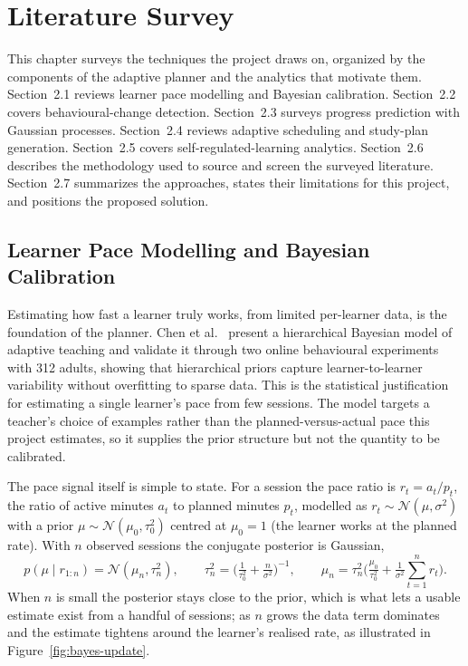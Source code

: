 \chapter{Literature Survey}
This chapter surveys the techniques the project draws on, organized by the components of the adaptive planner and the analytics that motivate them. Section~2.1 reviews learner pace modelling and Bayesian calibration. Section~2.2 covers behavioural-change detection. Section~2.3 surveys progress prediction with Gaussian processes. Section~2.4 reviews adaptive scheduling and study-plan generation. Section~2.5 covers self-regulated-learning analytics. Section~2.6 describes the methodology used to source and screen the surveyed literature. Section~2.7 summarizes the approaches, states their limitations for this project, and positions the proposed solution.

\section{Learner Pace Modelling and Bayesian Calibration}
Estimating how fast a learner truly works, from limited per-learner data, is the foundation of the planner. Chen et al.~\cite{chen2024} present a hierarchical Bayesian model of adaptive teaching and validate it through two online behavioural experiments with 312 adults, showing that hierarchical priors capture learner-to-learner variability without overfitting to sparse data. This is the statistical justification for estimating a single learner's pace from few sessions. The model targets a teacher's choice of examples rather than the planned-versus-actual pace this project estimates, so it supplies the prior structure but not the quantity to be calibrated.

The pace signal itself is simple to state. For a session the pace ratio is $r_t = a_t / p_t$, the ratio of active minutes $a_t$ to planned minutes $p_t$, modelled as $r_t \sim \mathcal{N}(\mu,\sigma^2)$ with a prior $\mu \sim \mathcal{N}(\mu_0,\tau_0^2)$ centred at $\mu_0=1$ (the learner works at the planned rate). With $n$ observed sessions the conjugate posterior is Gaussian,
\begin{equation}
p(\mu \mid r_{1:n}) = \mathcal{N}(\mu_n,\tau_n^2), \qquad
\tau_n^2 = \Big(\tfrac{1}{\tau_0^2}+\tfrac{n}{\sigma^2}\Big)^{-1}, \qquad
\mu_n = \tau_n^2\Big(\tfrac{\mu_0}{\tau_0^2}+\tfrac{1}{\sigma^2}\sum_{t=1}^{n} r_t\Big).
\label{eq:bayes-update}
\end{equation}
When $n$ is small the posterior stays close to the prior, which is what lets a usable estimate exist from a handful of sessions; as $n$ grows the data term dominates and the estimate tightens around the learner's realised rate, as illustrated in Figure~\ref{fig:bayes-update}.

